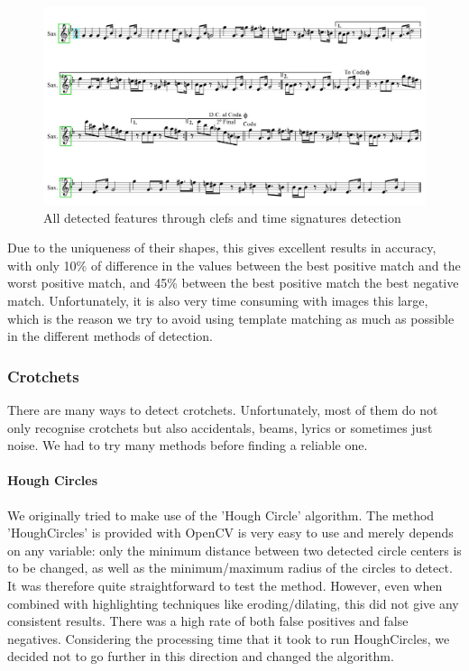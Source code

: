 \begin{figure}[h!]
	\centering
	\includegraphics[width=1\textwidth]{./assets/detectedfeatures.jpg}
	\caption{All detected features through clefs and time signatures detection}
	\label{image:detectedfeatures}
\end{figure}


Due to the uniqueness of their shapes, this gives excellent results in accuracy, with only 10\% of difference in the values between the best positive match and the worst positive match, and 45\% between the best positive match the best negative match. Unfortunately, it is also very time consuming with images this large, which is the reason we try to avoid using template matching as much as possible in the different
methods of detection.

\subsubsection{Crotchets}

There are many ways to detect crotchets. Unfortunately, most of them do not only recognise crotchets but also accidentals, beams, lyrics or sometimes just noise. We had to try many methods before finding a reliable one.

\paragraph{Hough Circles}

We originally tried to make use of the 'Hough Circle' algorithm. The method 'HoughCircles' is provided with OpenCV is very easy to use and merely depends on any variable: only the minimum distance between two detected circle centers is to be changed, as well as the minimum/maximum radius of the circles to detect. It was therefore quite straightforward to test the method. However, even when combined
with highlighting techniques like eroding/dilating, this did not give any consistent results. There was a high rate of both false positives and false negatives. Considering the processing time that it took to run HoughCircles, we decided not to go further in this direction and changed the algorithm.

